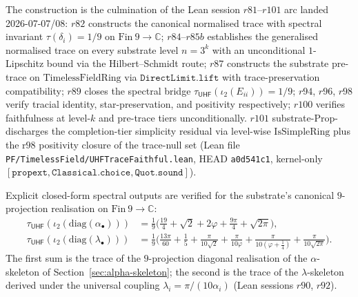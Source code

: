 \documentclass[11pt,a4paper]{amsart}
\theoremstyle{plain}
\theoremstyle{definition}
\begin{document}
The construction is the culmination of the Lean session $r81$--$r101$ arc landed 2026-07-07/08:
$r82$ constructs the canonical normalised trace with spectral invariant $\tau(\delta_{i}) = 1/9$ on $\mathrm{Fin}~9 \to \mathbb{C}$;
$r84$--$r85b$ establishes the generalised normalised trace on every substrate level $n = 3^{k}$ with an unconditional $1$-Lipschitz bound via the Hilbert--Schmidt route;
$r87$ constructs the substrate pre-trace on $\mathrm{TimelessFieldRing}$ via $\texttt{DirectLimit.lift}$ with trace-preservation compatibility;
$r89$ closes the spectral bridge $\tau_{\textsf{UHF}}(\iota_{2}(E_{ii})) = 1/9$;
$r94$, $r96$, $r98$ verify tracial identity, star-preservation, and positivity respectively;
$r100$ verifies faithfulness at level-$k$ and pre-trace tiers unconditionally.
$r101$ substrate-Prop-discharges the completion-tier simplicity residual via level-wise $\mathrm{IsSimpleRing}$ plus the r$98$ positivity closure of the trace-null set (Lean file \texttt{PF/TimelessField/UHFTraceFaithful.lean}, HEAD \texttt{a0d541c1}, kernel-only $[\texttt{propext}, \texttt{Classical.choice}, \texttt{Quot.sound}]$).

Explicit closed-form spectral outputs are verified for the substrate's canonical $9$-projection realisation on $\mathrm{Fin}~9 \to \mathbb{C}$:
\begin{align*}
\tau_{\textsf{UHF}}(\iota_{2}(\mathrm{diag}(\alpha_{\bullet}))) &= \tfrac{1}{9}\bigl( \tfrac{19}{4} + \sqrt{2} + 2\varphi + \tfrac{9\pi}{4} + \sqrt{2\pi} \bigr),\\
\tau_{\textsf{UHF}}(\iota_{2}(\mathrm{diag}(\lambda_{\bullet}))) &= \tfrac{1}{9}\bigl( \tfrac{13\pi}{60} + \tfrac{1}{5} + \tfrac{\pi}{10\sqrt{2}} + \tfrac{\pi}{10\varphi} + \tfrac{\pi}{10(\varphi+\tfrac{1}{4})} + \tfrac{\pi}{10\sqrt{2\pi}} \bigr).
\end{align*}
The first sum is the trace of the $9$-projection diagonal realisation of the $\alpha$-skeleton of Section~\ref{sec:alpha-skeleton}; the second is the trace of the $\lambda$-skeleton derived under the universal coupling $\lambda_{i} = \pi/(10\alpha_{i})$ (Lean sessions $r90$, $r92$).
\end{document}

